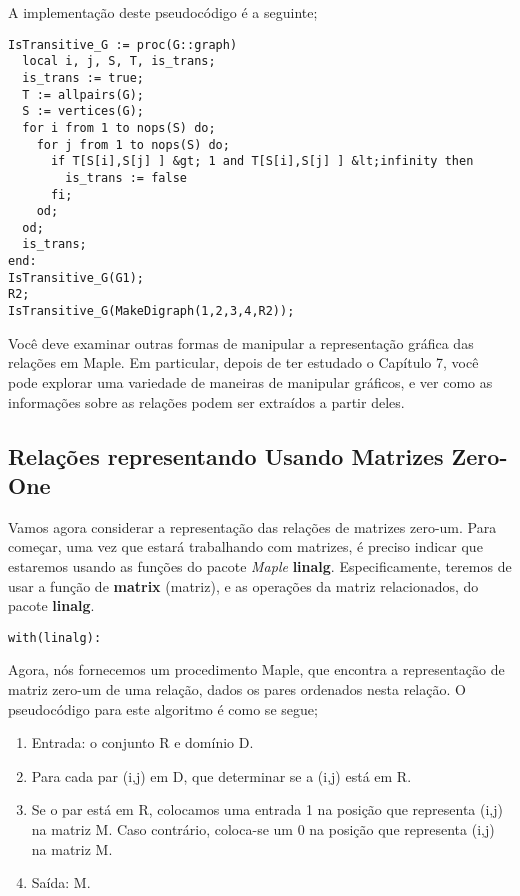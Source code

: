 \documentclass[a4paper]{article}
\begin{document}
A implementação deste pseudocódigo é a seguinte;

\begin{lstlisting}
IsTransitive_G := proc(G::graph)
  local i, j, S, T, is_trans;
  is_trans := true;
  T := allpairs(G);
  S := vertices(G);
  for i from 1 to nops(S) do;
    for j from 1 to nops(S) do;
      if T[S[i],S[j] ] &gt; 1 and T[S[i],S[j] ] &lt;infinity then
        is_trans := false
      fi;
    od;
  od;
  is_trans;
end:
IsTransitive_G(G1);
R2;
IsTransitive_G(MakeDigraph(1,2,3,4,R2));
\end{lstlisting}

Você deve examinar outras formas de manipular a representação gráfica das relações em Maple. Em particular, depois de ter estudado o Capítulo 7, você pode explorar uma variedade de maneiras de manipular gráficos, e ver como as informações sobre as relações podem ser extraídos a partir deles.

\subsection{Relações representando Usando Matrizes Zero-One}
Vamos agora considerar a representação das relações de matrizes zero-um. Para começar, uma vez que estará trabalhando com matrizes, é preciso indicar que estaremos usando as funções do pacote \textit{Maple} \textbf{linalg}. Especificamente, teremos de usar a função de \textbf{matrix} (matriz), e as operações da matriz relacionados, do pacote \textbf{linalg}.

\begin{lstlisting}
with(linalg):
\end{lstlisting}

Agora, nós fornecemos um procedimento Maple, que encontra a representação de matriz zero-um de uma relação, dados os pares ordenados nesta relação. O pseudocódigo para este algoritmo é como se segue;

\begin{enumerate}
\item{Entrada: o conjunto R e domínio D.}
\item{Para cada par (i,j) em D, que determinar se a (i,j) está em R.}
\item{Se o par está em R, colocamos uma entrada 1 na posição que representa (i,j) na matriz M. Caso contrário, coloca-se um 0 na posição que representa (i,j) na matriz M.}
\item{Saída: M.}
\end{enumerate}
\end{document}

